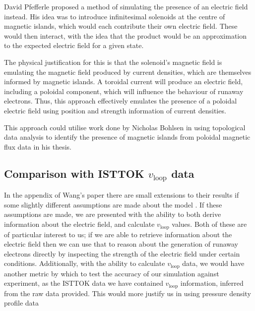 David Pfefferle proposed a method of simulating the presence of 
an electric field instead. His idea was to introduce infinitesimal 
solenoids at the centre of magnetic islands, which would each contribute their own electric field. These would then interact, with the idea 
that the product would be an approximation to the expected 
electric field for a given state. 

The physical justification for this is that the solenoid's magnetic field is 
emulating the magnetic field produced by current densities, which 
are themselves informed by magnetic islands. A toroidal current 
will produce an electric field, including a poloidal component, which 
will influence the behaviour of runaway electrons. Thus, this approach 
effectively emulates the presence of a poloidal electric field using 
position and strength information of current densities.

This approach could utilise work done by Nicholas Bohlsen in using topological 
data analysis to identify the presence of magnetic islands from poloidal magnetic flux data in his thesis.

\subsection{Comparison with ISTTOK $v_{\text{loop}}$ data}
In the appendix of Wang's paper there are small extensions to their results if 
some slightly different assumptions are made about the model \cite{wang-analytic-solution}. If these assumptions are made, we are presented with the 
ability to both derive information about the electric field, and calculate $v_{\text{loop}}$ values. Both of these
are of particular interest to us; if we are able to retrieve information about the electric field then we can use that to reason 
about the generation of runaway electrons directly by inspecting the strength of the electric field under certain conditions. 
Additionally, with the ability to calculate $v_{\text{loop}}$ data, we would have another metric by which to test the accuracy 
of our simulation against experiment, as the ISTTOK data we have contained $v_{\text{loop}}$ information, inferred from the 
raw data provided. This would more justify us in using pressure density profile data

